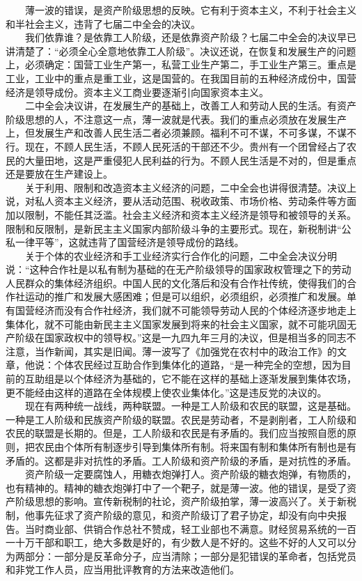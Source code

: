 \documentclass[cn,11pt,chinese]{elegantbook}
\begin{document}
　　薄一波的错误，是资产阶级思想的反映。它有利于资本主义，不利于社会主义和半社会主义，违背了七届二中全会的决议。\\
　　我们依靠谁？是依靠工人阶级，还是依靠资产阶级？七届二中全会的决议早已讲清楚了：“必须全心全意地依靠工人阶级”。决议还说，在恢复和发展生产的问题上，必须确定：国营工业生产第一，私营工业生产第二，手工业生产第三。重点是工业，工业中的重点是重工业，这是国营的。在我国目前的五种经济成份中，国营经济是领导成份。资本主义工商业要逐渐引向国家资本主义。\\
　　二中全会决议讲，在发展生产的基础上，改善工人和劳动人民的生活。有资产阶级思想的人，不注意这一点，薄一波就是代表。我们的重点必须放在发展生产上，但发展生产和改善人民生活二者必须兼顾。福利不可不谋，不可多谋，不谋不行。现在，不顾人民生活，不顾人民死活的干部还不少。贵州有一个团曾经占了农民的大量田地，这是严重侵犯人民利益的行为。不顾人民生活是不对的，但是重点还是要放在生产建设上。\\
　　关于利用、限制和改造资本主义经济的问题，二中全会也讲得很清楚。决议上说，对私人资本主义经济，要从活动范围、税收政策、市场价格、劳动条件等方面加以限制，不能任其泛滥。社会主义经济和资本主义经济是领导和被领导的关系。限制和反限制，是新民主主义国家内部阶级斗争的主要形式。现在，新税制讲“公私一律平等”，这就违背了国营经济是领导成份的路线。\\
　　关于个体的农业经济和手工业经济实行合作化的问题，二中全会决议分明说：“这种合作社是以私有制为基础的在无产阶级领导的国家政权管理之下的劳动人民群众的集体经济组织。中国人民的文化落后和没有合作社传统，使得我们的合作社运动的推广和发展大感困难；但是可以组织，必须组织，必须推广和发展。单有国营经济而没有合作社经济，我们就不可能领导劳动人民的个体经济逐步地走上集体化，就不可能由新民主主义国家发展到将来的社会主义国家，就不可能巩固无产阶级在国家政权中的领导权。”这是一九四九年三月的决议，但是相当多的同志不注意，当作新闻，其实是旧闻。薄一波写了《加强党在农村中的政治工作》的文章，他说：个体农民经过互助合作到集体化的道路，“是一种完全的空想，因为目前的互助组是以个体经济为基础的，它不能在这样的基础上逐渐发展到集体农场，更不能经由这样的道路在全体规模上使农业集体化。”这是违反党的决议的。\\
　　现在有两种统一战线，两种联盟。一种是工人阶级和农民的联盟，这是基础。一种是工人阶级和民族资产阶级的联盟。农民是劳动者，不是剥削者，工人阶级和农民的联盟是长期的。但是，工人阶级和农民是有矛盾的。我们应当按照自愿的原则，把农民由个体所有制逐步引导到集体所有制。将来国有制和集体所有制也是有矛盾的。这都是非对抗性的矛盾。工人阶级和资产阶级的矛盾，是对抗性的矛盾。\\
　　资产阶级一定要腐蚀人，用糖衣炮弹打人。资产阶级的糖衣炮弹，有物质的，也有精神的。精神的糖衣炮弹打中了一个靶子，就是薄一波。他的错误，是受了资产阶级思想的影响。宣传新税制的社论，资产阶级拍掌，薄一波高兴了。关于新税制，他事先征求了资产阶级的意见，和资产阶级订了君子协定，却没有向中央报告。当时商业部、供销合作总社不赞成，轻工业部也不满意。财经贸易系统的一百一十万干部和职工，绝大多数是好的，有少数人是不好的。这些不好的人又可以分为两部分：一部分是反革命分子，应当清除；一部分是犯错误的革命者，包括党员和非党工作人员，应当用批评教育的方法来改造他们。\\
\end{document}

